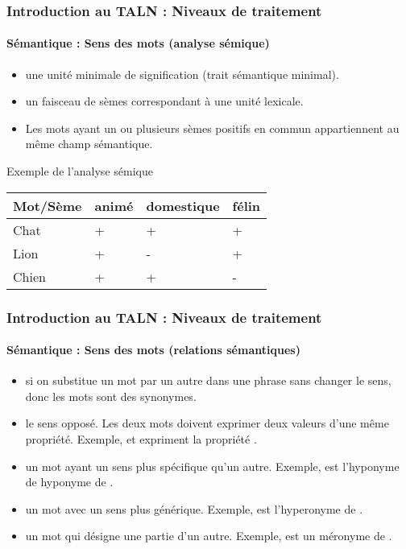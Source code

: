 \documentclass[xcolor=table]{beamer}
\begin{document}
\begin{frame}
\frametitle{Introduction au TALN : Niveaux de traitement}
\framesubtitle{Sémantique : Sens des mots (analyse sémique)}

\begin{itemize}
	\item {} une unité minimale de signification (trait sémantique minimal).
	\item {} un faisceau de sèmes correspondant à une unité lexicale.
	\item Les mots ayant un ou plusieurs sèmes positifs en commun appartiennent au même champ sémantique.
\end{itemize}

\begin{exampleblock}{Exemple de l'analyse sémique}
	\centering
	\begin{tabular}{|l|l|l|l|}
		\hline
		Mot/Sème & animé & domestique & félin \\
		\hline
		Chat & + & + & + \\
		\hline
		Lion & + & - & + \\
		\hline
		Chien & + & + & - \\
		\hline
	\end{tabular}
\end{exampleblock}

\end{frame}

\begin{frame}
\frametitle{Introduction au TALN : Niveaux de traitement}
\framesubtitle{Sémantique : Sens des mots (relations sémantiques)}

\begin{itemize}
	\item {} si on substitue un mot par un autre dans une phrase sans changer le sens, donc les mots sont des synonymes.
	\item {} le sens opposé. Les deux mots doivent exprimer deux valeurs d'une même propriété. Exemple,  et  expriment la propriété .
	\item {} un mot ayant un sens plus spécifique qu'un autre. 
	Exemple,  est l'hyponyme de  hyponyme de . 
	\item {} un mot avec un sens plus générique. 
	Exemple,  est l'hyperonyme de .
	\item {} un mot qui désigne une partie d'un autre. 
	Exemple,  est un méronyme de .
\end{itemize}

\end{frame}
\end{document}

